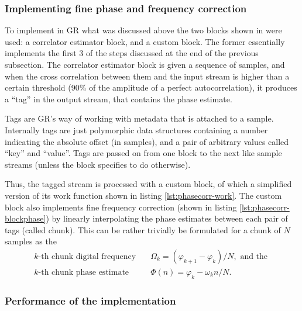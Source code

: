 \subsubsection{Implementing fine phase and frequency correction} \label{sec:implement-phasecorr}

To implement in GR what was discussed above the two blocks shown in  were used: a correlator estimator block, and a custom block. The former essentially implements the first 3 of the steps discussed at the end of the previous subsection. The correlator estimator block is given a sequence of samples, and when the cross correlation between them and the input stream is higher than a certain threshold (90\% of the amplitude of a perfect autocorrelation), it produces a ``tag'' in the output stream, that contains the phase estimate.

Tags are GR's way of working with metadata that is attached to a sample. Internally tags are just polymorphic data structures containing a number indicating the absolute offset (in samples), and a pair of arbitrary values called ``key'' and ``value''. Tags are passed on from one block to the next like sample streams (unless the block specifies to do otherwise).

Thus, the tagged stream is processed with a custom block, of which a simplified version of its work function shown in listing \ref{lst:phasecorr-work}. The custom block also implements fine frequency correction (shown in listing \ref{lst:phasecorr-blockphase}) by linearly interpolating the phase estimates between each pair of tags (called chunk). This can be rather trivially be formulated for a chunk of \(N\) samples as the
\begin{subequations}
	\begin{align}
		k\text{-th chunk digital frequency} \quad  & \Omega_k = (\varphi_{k+1} - \varphi_k) / N, \text{ and the }\\
		k\text{-th chunk phase estimate} \quad & \Phi(n) = \varphi_k - \omega_k n/N.
	\end{align}
\end{subequations}

\subsubsection{Performance of the implementation}\label{sec:preforming-implementation}

